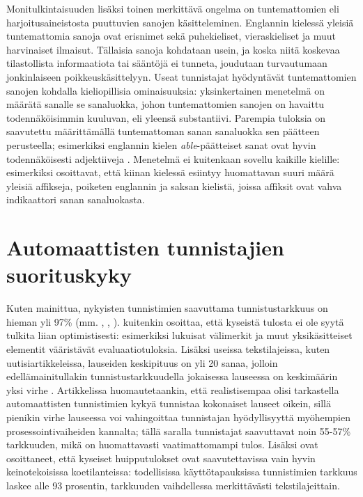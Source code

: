 \documentclass[utf8,bachelor,manualbib]{gradu3}
\begin{document}
Monitulkintaisuuden lisäksi toinen merkittävä ongelma on tuntemattomien eli harjoitusaineistosta puuttuvien sanojen käsitteleminen. Englannin kielessä yleisiä tuntemattomia sanoja ovat erisnimet sekä puhekieliset, vieraskieliset ja muut harvinaiset ilmaisut. Tällaisia sanoja kohdataan usein, ja koska niitä koskevaa tilastollista informaatiota tai sääntöjä ei tunneta, joudutaan turvautumaan jonkinlaiseen poikkeuskäsittelyyn. Useat tunnistajat hyödyntävät tuntemattomien sanojen kohdalla kieliopillisia ominaisuuksia: yksinkertainen menetelmä on määrätä sanalle se sanaluokka, johon tuntemattomien sanojen on havaittu todennäköisimmin kuuluvan, eli yleensä substantiivi. Parempia tuloksia on saavutettu määrittämällä tuntemattoman sanan sanaluokka sen päätteen perusteella; esimerkiksi englannin kielen \emph{able}-päätteiset sanat ovat hyvin todennäköisesti adjektiiveja \citep{samuelsson1993}. Menetelmä ei kuitenkaan sovellu kaikille kielille: esimerkiksi \citet{tseng2005} osoittavat, että kiinan kielessä esiintyy huomattavan suuri määrä yleisiä affikseja, poiketen englannin ja saksan kielistä, joissa affiksit ovat vahva indikaattori sanan sanaluokasta.


\section{Automaattisten tunnistajien suorituskyky}

Kuten mainittua, nykyisten tunnistimien saavuttama tunnistustarkkuus on hieman yli 97\%  (mm. \citealp{toutanova2003}, \citealp{shen2007}, \citealp{spoustova2009}). \citet{manning2011} kuitenkin osoittaa, että kyseistä tulosta ei ole syytä tulkita liian optimistisesti: esimerkiksi lukuisat välimerkit ja muut yksikäsitteiset elementit vääristävät evaluaatiotuloksia. Lisäksi useissa tekstilajeissa, kuten uutisiartikkeleissa, lauseiden keskipituus on yli 20 sanaa, jolloin edellämainitullakin tunnistustarkkuudella jokaisessa lauseessa on keskimäärin yksi virhe \citep{manning1999}. Artikkelissa huomautetaankin, että realistisempaa olisi tarkastella automaattisten tunnistimien kykyä tunnistaa kokonaiset lauseet oikein, sillä pienikin virhe lauseessa voi vahingoittaa tunnistajan hyödyllisyyttä myöhempien prosessointivaiheiden kannalta; tällä saralla tunnistajat saavuttavat noin 55-57\% tarkkuuden, mikä on huomattavasti vaatimattomampi tulos. Lisäksi  ovat osoittaneet, että kyseiset huipputulokset ovat saavutettavissa vain hyvin keinotekoisissa koetilanteissa: todellisissa käyttötapauksissa tunnistimien tarkkuus laskee alle 93 prosentin, tarkkuuden vaihdellessa merkittävästi tekstilajeittain.
\end{document}
